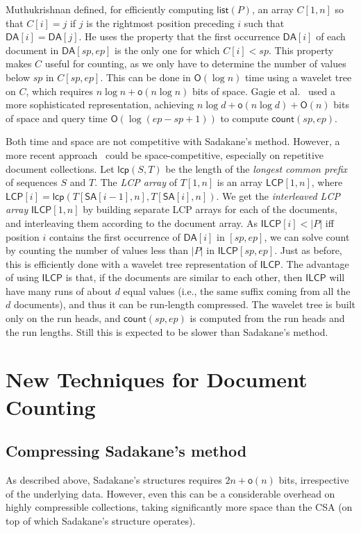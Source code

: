 \documentclass[11pt]{llncs}
\newcommand{\abs}[1]{\ensuremath{\lvert #1 \rvert}}
\newcommand{\SA}{\ensuremath{\mathsf{SA}}}
\newcommand{\DA}{\ensuremath{\mathsf{DA}}}
\newcommand{\LCP}{\ensuremath{\mathsf{LCP}}}
\newcommand{\ILCP}{\ensuremath{\mathsf{ILCP}}}
\newcommand{\doccount}{\textsf{count}}
\newcommand{\mcount}{\ensuremath{\mathsf{count}}}
\newcommand{\mlist}{\ensuremath{\mathsf{list}}}
\newcommand{\mlcp}{\ensuremath{\mathsf{lcp}}}
\newcommand{\Oh}{\ensuremath{\mathsf{O}}}
\newcommand{\oh}{\ensuremath{\mathsf{o}}}
\begin{document}
Muthukrishnan \cite{Mut02} defined, for efficiently computing $\mlist(P)$, an
array $C[1,n]$ so that $C[i]=j$ if $j$ is the rightmost position preceding 
$i$ such that $\DA[i]=\DA[j]$. He uses the property that the first occurrence
$\DA[i]$ of each document in $\DA[sp,ep]$ is the only one for which
$C[i] < sp$. This property makes $C$ useful for counting, as we only have to
determine the number of values below $sp$ in $C[sp,ep]$. This can be done in
$\Oh(\log n)$ time using a wavelet tree \cite{GGV03} on $C$, which requires 
$n\log n + \oh(n\log n)$ bits of space. Gagie et al.~\cite{GKNP13} used a more
sophisticated representation, achieving $n\log d + \oh(n\log d)+\Oh(n)$ bits of
space and query time $\Oh(\log (ep-sp+1))$ to compute $\mcount(sp,ep)$.

Both time and space are not competitive with Sadakane's method. However, a
more recent approach~\cite{GKNPS13} could be space-competitive, especially on
repetitive document collections.
Let $\mlcp(S,T)$ be the length of the \emph{longest common prefix} of
sequences $S$ and $T$. The \emph{LCP array} of $T[1,n]$ is an array
$\LCP[1,n]$, where $\LCP[i] = \mlcp(T[\SA[i-1],n], T[\SA[i],n])$. We get the
\emph{interleaved LCP array} $\ILCP[1,n]$ by building separate LCP arrays for
each of the documents, and interleaving them according to the document array.
As $\ILCP[i] < \abs{P}$ iff position $i$ contains the first occurrence of
$\DA[i]$ in $[sp,ep]$, we can solve \doccount{} by counting the number of
values less than $\abs{P}$ in $\ILCP[sp,ep]$. Just as before, this is 
efficiently done with a wavelet tree representation of $\ILCP$. The advantage 
of using $\ILCP$ is that, if the documents are similar to each other, then
$\ILCP$ will have many runs of about $d$ equal values (i.e., the same suffix
coming from all the $d$ documents), and thus it can be run-length compressed.
The wavelet tree is built only on the run heads, and $\mcount(sp,ep)$ is
computed from the run heads and the run lengths. Still this is expected to
be slower than Sadakane's method.

\section{New Techniques for Document Counting}
\label{section:new}
\subsection{Compressing Sadakane's method}

As described above, Sadakane's structures requires $2n + \oh(n)$ bits,
irrespective of the underlying data. However, even this can be a considerable
overhead on highly compressible collections, taking significantly more space
than the CSA (on top of which Sadakane's structure operates).
\end{document}
